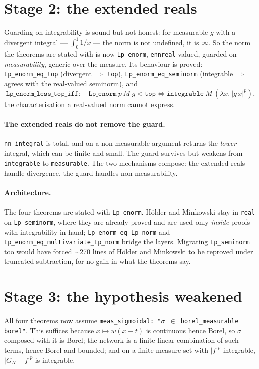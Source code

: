 \documentclass[11pt,a4paper]{article}
\newcommand{\isa}[1]{\texttt{#1}}
\begin{document}
\section{Stage 2: the extended reals}

Guarding on integrability is sound but not honest: for measurable $g$ with a divergent integral
--- $\int_0^1 1/x$ --- the norm is not undefined, it is $\infty$. So the norm the theorems are
stated with is now \isa{Lp\_enorm}, \isa{ennreal}-valued, guarded on \emph{measurability},
generic over the measure. Its behaviour is proved: \isa{Lp\_enorm\_eq\_top} (divergent
$\Rightarrow$ \isa{top}), \isa{Lp\_enorm\_eq\_seminorm} (integrable $\Rightarrow$ agrees with
the real-valued seminorm), and
\[
  \isa{Lp\_enorm\_less\_top\_iff}:\quad
  \isa{Lp\_enorm}\ p\ M\ g < \isa{top} \iff \isa{integrable}\ M\ (\lambda x.\ |g\,x|^{p}),
\]
the characterisation a real-valued norm cannot express.

\paragraph{The extended reals do not remove the guard.} \isa{nn\_integral} is total, and on a
non-measurable argument returns the \emph{lower} integral, which can be finite and small. The
guard survives but weakens from \isa{integrable} to \isa{measurable}. The two mechanisms
compose: the extended reals handle divergence, the guard handles non-measurability.

\paragraph{Architecture.} The four theorems are stated with \isa{Lp\_enorm}. H\"older and
Minkowski stay in \isa{real} on \isa{Lp\_seminorm}, where they are already proved and are used
only \emph{inside} proofs with integrability in hand; \isa{Lp\_enorm\_eq\_Lp\_norm} and
\isa{Lp\_enorm\_eq\_multivariate\_Lp\_norm} bridge the layers. Migrating \isa{Lp\_seminorm} too
would have forced $\sim$270 lines of H\"older and Minkowski to be reproved under truncated
subtraction, for no gain in what the theorems say.

\section{Stage 3: the hypothesis weakened}

All four theorems now assume \isa{meas\_sigmoidal: "\(\sigma\) \(\in\) borel\_measurable
borel"}. This suffices because $x\mapsto w(x-t)$ is continuous hence Borel, so $\sigma$ composed
with it is Borel; the network is a finite linear combination of such terms, hence Borel and
bounded; and on a finite-measure set with $|f|^p$ integrable, $|G_N-f|^p$ is integrable.
\end{document}

